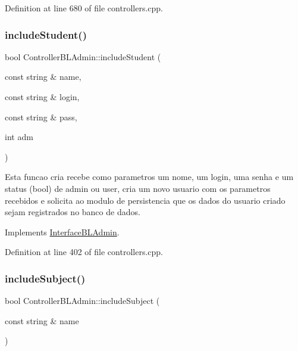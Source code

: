 Definition at line 680 of file controllers.\+cpp.

\mbox{\label{class_controller_b_l_admin_a6e077c2cf0d0420c4104a637e930b764}} 
\subsubsection{\texorpdfstring{include\+Student()}{includeStudent()}}
{\footnotesize\ttfamily bool Controller\+B\+L\+Admin\+::include\+Student (\begin{DoxyParamCaption}\item[{const string \&}]{name,  }\item[{const string \&}]{login,  }\item[{const string \&}]{pass,  }\item[{int}]{adm }\end{DoxyParamCaption})\hspace{0.3cm}{\ttfamily [virtual]}}

Esta funcao cria recebe como parametros um nome, um login, uma senha e um status (bool) de admin ou user, cria um novo usuario com os parametros recebidos e solicita ao modulo de persistencia que os dados do usuario criado sejam registrados no banco de dados. 

Implements \hyperlink{class_interface_b_l_admin_a716e03cae2e978d281f813ea98137191}{Interface\+B\+L\+Admin}.



Definition at line 402 of file controllers.\+cpp.

\mbox{\label{class_controller_b_l_admin_a6c78d14f6b7fa350a63c5dbb2ac31084}} 
\subsubsection{\texorpdfstring{include\+Subject()}{includeSubject()}}
{\footnotesize\ttfamily bool Controller\+B\+L\+Admin\+::include\+Subject (\begin{DoxyParamCaption}\item[{const string \&}]{name }\end{DoxyParamCaption})\hspace{0.3cm}{\ttfamily [virtual]}}

